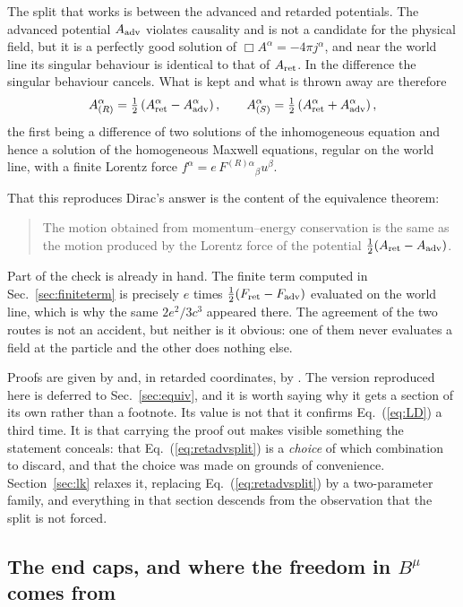 \documentclass[preprint]{aastex701}
\newcommand{\Aret}{A^\alpha_{\rm ret}}
\newcommand{\Aadv}{A^\alpha_{\rm adv}}
\begin{document}
The split that works is between the advanced and retarded potentials. The
advanced potential $A_{\rm adv}$ violates causality and is not a candidate for
the physical field, but it is a perfectly good solution of
$\Box A^\alpha = -4\pi j^\alpha$, and near the world line its singular behaviour
is identical to that of $A_{\rm ret}$. In the difference the singular behaviour
cancels. What is kept and what is thrown away are therefore
\begin{equation}
A^\alpha_{(R)} = \tfrac12\left(\Aret - \Aadv\right),
\qquad
A^\alpha_{(S)} = \tfrac12\left(\Aret + \Aadv\right),
\label{eq:retadvsplit}
\end{equation}
the first being a difference of two solutions of the inhomogeneous equation and
hence a solution of the homogeneous Maxwell equations, regular on the world line,
with a finite Lorentz force
$f^\alpha = e\,F^{(R)\alpha}{}_\beta u^\beta$.

That this reproduces Dirac's answer is the content of the equivalence theorem:

\begin{quote}
The motion obtained from momentum--energy conservation is the same as the motion
produced by the Lorentz force of the potential
$\tfrac12(A_{\rm ret}-A_{\rm adv})$.
\end{quote}

Part of the check is already in hand. The finite term computed in
Sec.~\ref{sec:finiteterm} is precisely $e$ times
$\tfrac12(F_{\rm ret}-F_{\rm adv})$ evaluated on the world line, which is why
the same $2e^2/3c^3$ appeared there. The agreement of the two routes is not an
accident, but neither is it obvious: one of them never evaluates a field at the
particle and the other does nothing else.

Proofs are given by \citet{zhang_zongsui} and, in retarded coordinates, by
\citet{poisson2004}. The version reproduced here is deferred to
Sec.~\ref{sec:equiv}, and it is worth saying why it
gets a section of its own rather than a footnote. Its value is not that it
confirms Eq.~(\ref{eq:LD}) a third time. It is that carrying the proof out makes
visible something the statement conceals: that Eq.~(\ref{eq:retadvsplit}) is a
\emph{choice} of which combination to discard, and that the choice was made on
grounds of convenience. Section~\ref{sec:lk} relaxes it, replacing
Eq.~(\ref{eq:retadvsplit}) by a two-parameter family, and everything in that
section descends from the observation that the split is not forced.

\subsection{The end caps, and where the freedom in $B^\mu$ comes from}
\label{sec:reservations}
\end{document}
